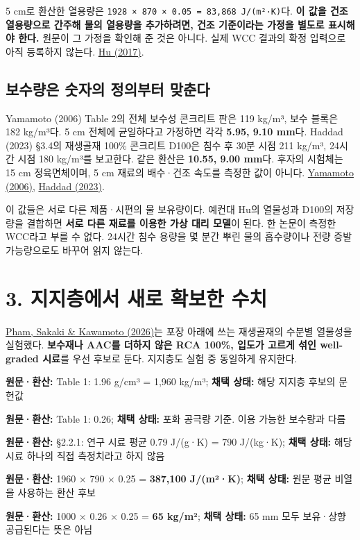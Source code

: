 \documentclass[11pt,a4paper]{article}
\begin{document}
5 cm로 환산한 열용량은 \texttt{1928 × 870 × 0.05 = 83,868 J/(m²·K)}다. \textbf{이 값을 건조 열용량으로 간주해 물의 열용량을 추가하려면, 건조 기준이라는 가정을 별도로 표시해야 한다.} 원문이 그 가정을 확인해 준 것은 아니다. 실제 WCC 결과의 확정 입력으로 아직 등록하지 않는다. \href{\detokenize{https://doi.org/10.1155/2017/2058034}}{Hu (2017)}.

\subsection{보수량은 숫자의 정의부터 맞춘다}

Yamamoto (2006) Table 2의 전체 보수성 콘크리트 판은 119 kg/m³, 보수 블록은 182 kg/m³다. 5 cm 전체에 균일하다고 가정하면 각각 \textbf{5.95, 9.10 mm}다. Haddad (2023) §3.4의 재생골재 100\% 콘크리트 D100은 침수 후 30분 시점 211 kg/m³, 24시간 시점 180 kg/m³를 보고한다. 같은 환산은 \textbf{10.55, 9.00 mm}다. 후자의 시험체는 15 cm 정육면체이며, 5 cm 재료의 배수·건조 속도를 측정한 값이 아니다. \href{\detokenize{https://www.sept.org/techpapers/1313.pdf}}{Yamamoto (2006)}, \href{\detokenize{https://doi.org/10.3390/su15065384}}{Haddad (2023)}.

이 값들은 서로 다른 제품·시편의 물 보유량이다. 예컨대 Hu의 열물성과 D100의 저장량을 결합하면 \textbf{서로 다른 재료를 이용한 가상 대리 모델}이 된다. 한 논문이 측정한 WCC라고 부를 수 없다. 24시간 침수 용량을 몇 분간 뿌린 물의 흡수량이나 전량 증발 가능량으로도 바꾸어 읽지 않는다.

\section{3. 지지층에서 새로 확보한 수치}

\href{\detokenize{https://doi.org/10.3390/constrmater6010010}}{Pham, Sakaki \& Kawamoto (2026)}는 포장 아래에 쓰는 재생골재의 수분별 열물성을 실험했다. \textbf{보수재나 AAC를 더하지 않은 RCA 100\%, 입도가 고르게 섞인 well-graded 시료}를 우선 후보로 둔다. 지지층도 실험 중 동일하게 유지한다.

\begin{description}[leftmargin=0pt,style=nextline]
\item[건조 밀도] \textbf{원문·환산:} Table 1: 1.96 g/cm³ = 1,960 kg/m³; \textbf{채택 상태:} 해당 지지층 후보의 문헌값
\item[공극률] \textbf{원문·환산:} Table 1: 0.26; \textbf{채택 상태:} 포화 공극량 기준. 이용 가능한 보수량과 다름
\item[건조 재료 비열] \textbf{원문·환산:} §2.2.1: 연구 시료 평균 0.79 J/(g·K) = 790 J/(kg·K); \textbf{채택 상태:} 해당 시료 하나의 직접 측정치라고 하지 않음
\item[건조 면적 열용량] \textbf{원문·환산:} 1960 × 790 × 0.25 = \textbf{387,100 J/(m²·K)}; \textbf{채택 상태:} 원문 평균 비열을 사용하는 환산 후보
\item[전체 공극의 물 환산] \textbf{원문·환산:} 1000 × 0.26 × 0.25 = \textbf{65 kg/m²}; \textbf{채택 상태:} 65 mm 모두 보유·상향 공급된다는 뜻은 아님
\end{description}
\end{document}
